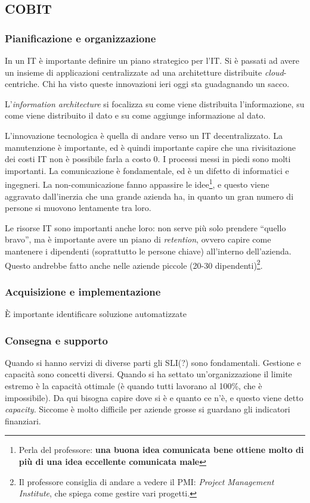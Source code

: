 \subsection{COBIT}

\subsubsection{Pianificazione e organizzazione}

In un IT è importante definire un piano strategico per l'IT. Si è passati ad 
avere un insieme di applicazioni centralizzate ad una architetture distribuite 
\textit{cloud}-centriche. Chi ha visto queste innovazioni ieri oggi sta 
guadagnando un sacco.

L'\textit{information architecture} si focalizza su come viene distribuita 
l'informazione, su come viene distribuito il dato e su come aggiunge 
informazione al dato.

L'innovazione tecnologica è quella di andare verso un IT decentralizzato. La 
manutenzione è importante, ed è quindi importante capire che una rivisitazione 
dei costi IT non è possibile farla a costo 0. I processi messi in piedi sono 
molti importanti. La comunicazione è fondamentale, ed è un difetto di 
informatici e ingegneri. La non-comunicazione fanno appassire le 
idee\footnote{Perla del professore: \textbf{una buona idea comunicata bene 
ottiene molto di più di una idea eccellente comunicata male}}, e questo viene 
aggravato dall'inerzia che una grande azienda ha, in quanto un gran numero di 
persone si muovono lentamente tra loro.

Le risorse IT sono importanti anche loro: non serve più solo prendere ``quello 
bravo'', ma è importante avere un piano di \textit{retention}, ovvero capire 
come mantenere i dipendenti (soprattutto le persone chiave) all'interno 
dell'azienda. Questo andrebbe fatto anche nelle aziende piccole (20-30 
dipendenti)\footnote{Il professore consiglia di andare a vedere il PMI: 
\textit{Project Management Institute}, che spiega come gestire vari progetti.}.

\subsubsection{Acquisizione e implementazione}

È importante identificare soluzione automatizzate 


\subsubsection{Consegna e supporto}

Quando si hanno servizi di diverse parti gli SLI(?) sono fondamentali.
Gestione e capacità sono concetti diversi. Quando si ha settato 
un'organizzazione il limite estremo è la capacità ottimale (è quando tutti 
lavorano al 100\%, che è impossibile). Da qui bisogna capire dove si è e quanto 
ce n'è, e questo viene detto \textit{capacity}. Siccome è molto difficile per 
aziende grosse si guardano gli indicatori finanziari.
